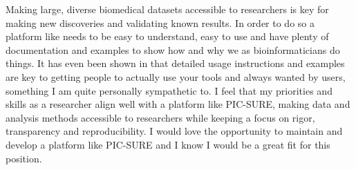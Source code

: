 \documentclass[11pt, a4paper]{./Awesome-CV/awesome-cv}
\begin{document}
\begin{cvletter}
Making large, diverse biomedical datasets accessible to researchers is key for making new discoveries and validating known results.
In order to do so a  platform like needs to be easy to understand, easy to use and have plenty of documentation and examples to show how and why we as bioinformaticians do things.
It has even been shown in  that detailed usage instructions and examples are key to getting people to actually use your tools and always wanted by users, something I am quite personally sympathetic to.
I feel that my priorities and skills as a researcher align well with a platform like PIC-SURE, making data and analysis methods accessible to researchers while keeping a focus on rigor, transparency and reproducibility. 
I would love the opportunity to maintain and develop a platform like PIC-SURE and I know I would be a great fit for this position.

\end{cvletter}
\makeletterclosing
\end{document}
